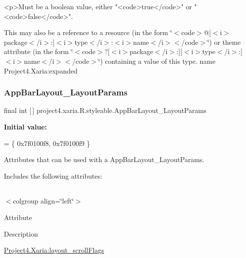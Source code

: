 \begin{DoxyVerb}      <p>Must be a boolean value, either "<code>true</code>" or "<code>false</code>".
\end{DoxyVerb}
 

This may also be a reference to a resource (in the form \char`\"{}$<$code$>$@\mbox{[}$<$i$>$package$<$/i$>$\+:\mbox{]}$<$i$>$type$<$/i$>$\+:$<$i$>$name$<$/i$>$$<$/code$>$\char`\"{}) or theme attribute (in the form \char`\"{}$<$code$>$?\mbox{[}$<$i$>$package$<$/i$>$\+:\mbox{]}\mbox{[}$<$i$>$type$<$/i$>$\+:\mbox{]}$<$i$>$name$<$/i$>$$<$/code$>$\char`\"{}) containing a value of this type.  name Project4.\+Xaria\+:expanded \mbox{\label{classproject4_1_1xaria_1_1R_1_1styleable_ad61d02ae9d1a09e70900bcff9afa224d}} 
\subsubsection{\texorpdfstring{App\+Bar\+Layout\+\_\+\+Layout\+Params}{AppBarLayout\_LayoutParams}}
{\footnotesize\ttfamily final int \mbox{[}$\,$\mbox{]} project4.\+xaria.\+R.\+styleable.\+App\+Bar\+Layout\+\_\+\+Layout\+Params\hspace{0.3cm}{\ttfamily [static]}}

{\bfseries Initial value\+:}
\begin{DoxyCode}
= \{
            0x7f0100f8, 0x7f0100f9
        \}
\end{DoxyCode}
Attributes that can be used with a App\+Bar\+Layout\+\_\+\+Layout\+Params. 

Includes the following attributes\+:

\tabulinesep=1mm
\begin{longtabu} spread 0pt [c]{*{0}{|X[-1]}|}
\hline
\end{longtabu}
$<$colgroup align=\char`\"{}left\char`\"{}$>$ 

Attribute

Description 

{\ttfamily \hyperlink{classproject4_1_1xaria_1_1R_1_1styleable_a765b6973ff46793cb361150ce22c3f86}{Project4.\+Xaria\+:layout\+\_\+scroll\+Flags}}

